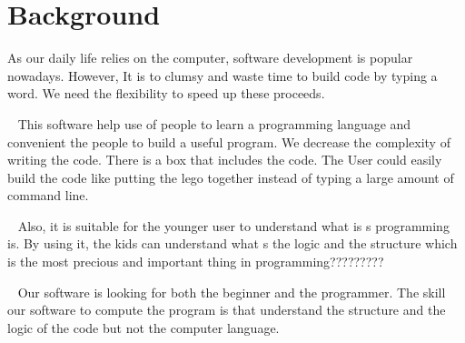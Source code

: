 \chapter{Background}
As our daily life relies on the computer, software development is popular nowadays. However, It is to clumsy and waste time to build code by typing a word. We need the flexibility to speed up these proceeds.\par~
This software help use of people to learn a programming language and convenient the people to build a useful program. We decrease the complexity of writing the code. There is a box that includes the code. The User could easily build the code like putting the lego together instead of typing a large amount of command line.\par~
Also, it is suitable for the younger user to understand what is s programming is. By using it, the kids can understand what s the logic and the structure which is the most precious and important thing in programming?????????\par~
Our software is looking for both the beginner and the programmer. The skill our software to compute the program is that understand the structure and the logic of the code but not the computer language.\par~
